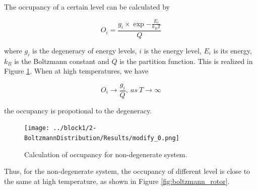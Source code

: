 \documentclass{assignmeownt}
\begin{document}
The occupancy of a certain level can be calculated by

$$ O_i=\frac{g_i\times \exp{-\frac{E_i}{k_BT}}}{Q}$$

where $g_i$ is the degeneracy of energy levels, $i$ is the energy level, $E_i$ is its energy, $k_B$ is
the Boltzmann constant and $Q$ is the partition function. This is realized in Figure \ref{fig:boltzmann_modify}. When at high temperatures, we have

$$ O_i\rightarrow \frac{g_i}{Q},\ as\ T\rightarrow\infty$$

the occupancy is propotional to the degeneracy.

\begin{figure}
  \centering
  \texttt{[image: ../block1/2-BoltzmannDistribution/Results/modify\_0.png]}
  \caption{Calculation of occupancy for non-degenerate system.}
  \label{fig:boltzmann_modify}
\end{figure}

Thus, for the non-degenerate system, the occupancy of different level is close to the same at high temperature, as shown in Figure \ref{fig:boltzmann_rotor}.
\end{document}

